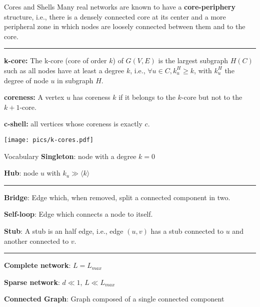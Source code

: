 \begin{textbox}{Cores and Shells}
    Many real networks are known to have a \textbf{core-periphery} structure, i.e., there is a densely connected core at its center and a more peripheral zone in which nodes are loosely connected between them and to the core.

    \noindent\rule{4cm}{0.1pt}

    \textbf{k-core:} The  k-core (core of order $k$) of $G(V,E)$ is the largest subgraph $H(C)$ such as all nodes have at least a degree $k$, i.e.,  $\forall u \in C, {k}^H_u \geq k$, with $k^H_u$ the degree of node $u$ in subgraph $H$.

    \textbf{coreness:} A vertex $u$ has coreness $k$ if it belongs to the $k$-core but not to the $k+1$-core.

    \textbf{c-shell:} all vertices whose coreness is exactly $c$.

    \centering
    \texttt{[image: pics/k-cores.pdf]}
\end{textbox}


\begin{textbox}{Vocabulary}
    \textbf{Singleton}: node with a degree $k=0$

    \textbf{Hub}: node $u$ with $k_u \gg \langle k \rangle$

    \noindent\rule{4cm}{0.1pt}

    \textbf{Bridge}: Edge which, when removed, split a connected component in two.

    \textbf{Self-loop}: Edge which connects a node to itself.

    \textbf{Stub}: A stub is an half edge, i.e., edge $(u,v)$ has a stub connected to $u$ and another connected to $v$.

    \noindent\rule{4cm}{0.1pt}

    \textbf{Complete network}: $L=L_{max}$

    \textbf{Sparse network}: $d \ll 1$, $ L \ll L_{max}$

    \textbf{Connected Graph}: Graph composed of a single connected component
\end{textbox}



